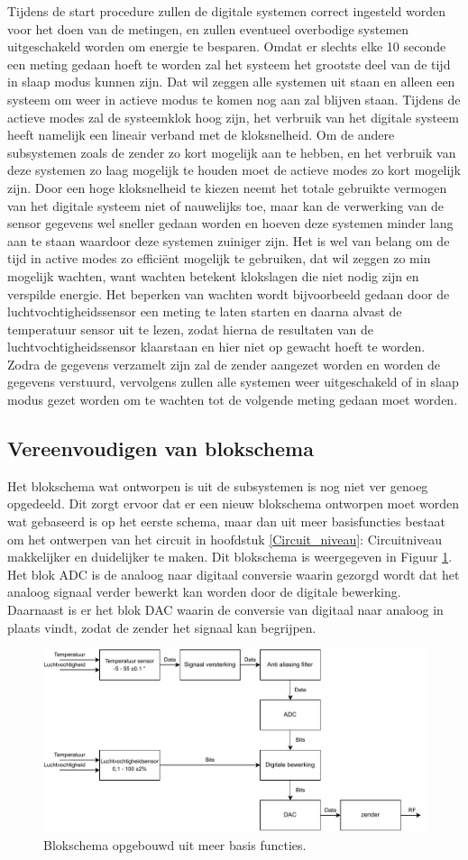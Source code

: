 Tijdens de start procedure zullen de digitale systemen correct ingesteld worden voor het doen van de metingen, en zullen eventueel overbodige systemen uitgeschakeld worden om energie te besparen. Omdat er slechts elke 10 seconde een meting gedaan hoeft te worden zal het systeem het grootste deel van de tijd in slaap modus kunnen zijn. Dat wil zeggen alle systemen uit staan en alleen een systeem om weer in actieve modus te komen nog aan zal blijven staan. Tijdens de actieve modes zal de systeemklok hoog zijn, het verbruik van het digitale systeem heeft namelijk een lineair verband met de kloksnelheid. Om de andere subsystemen zoals de zender zo kort mogelijk aan te hebben, en het verbruik van deze systemen zo laag mogelijk te houden moet de actieve modes zo kort mogelijk zijn. Door een hoge kloksnelheid te kiezen neemt het totale gebruikte vermogen van het digitale systeem niet of nauwelijks toe, maar kan de verwerking van de sensor gegevens wel sneller gedaan worden en hoeven deze systemen minder lang aan te staan waardoor deze systemen zuiniger zijn. Het is wel van belang om de tijd in active modes zo efficiënt mogelijk te gebruiken, dat wil zeggen zo min mogelijk wachten, want wachten betekent klokslagen die niet nodig zijn en verspilde energie. Het beperken van wachten wordt bijvoorbeeld gedaan door de luchtvochtigheidssensor een meting te laten starten en daarna alvast de temperatuur sensor uit te lezen, zodat hierna de resultaten van de luchtvochtigheidssensor klaarstaan en hier niet op gewacht hoeft te worden. Zodra de gegevens verzamelt zijn zal de zender aangezet worden en worden de gegevens verstuurd, vervolgens zullen alle systemen weer uitgeschakeld of in slaap modus gezet worden om te wachten tot de volgende meting gedaan moet worden.


\subsection{Vereenvoudigen van blokschema}
Het blokschema wat ontworpen is uit de subsystemen is nog niet ver genoeg opgedeeld. Dit zorgt ervoor dat er een nieuw blokschema ontworpen moet worden wat gebaseerd is op het eerste schema, maar dan uit meer basisfuncties bestaat om het ontwerpen van het circuit in hoofdstuk \ref{Circuit_niveau}: Circuitniveau makkelijker en duidelijker te maken. Dit blokschema is weergegeven in Figuur \ref{fig:bigger_blok_schematic}. Het blok ADC is de analoog naar digitaal conversie waarin gezorgd wordt dat het analoog signaal verder bewerkt kan worden door de digitale bewerking. Daarnaast is er het blok DAC waarin de conversie van digitaal naar analoog in plaats vindt, zodat de zender het signaal kan begrijpen.

\begin{figure}[H]
    \centering
    \includegraphics[width=1\linewidth]{pictures/blokschema.drawio.pdf}
    \caption{Blokschema opgebouwd uit meer basis functies.}
    \label{fig:bigger_blok_schematic}
\end{figure}